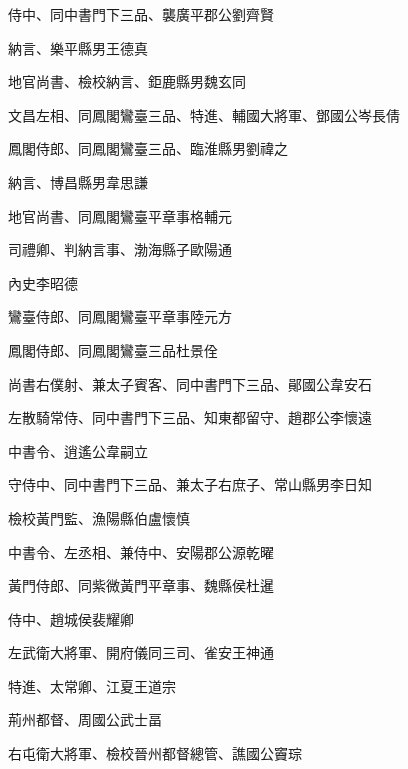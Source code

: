 \begin{pinyinscope}
 侍中、同中書門下三品、襲廣平郡公劉齊賢



 納言、樂平縣男王德真



 地官尚書、檢校納言、鉅鹿縣男魏玄同



 文昌左相、同鳳閣鸞臺三品、特進、輔國大將軍、鄧國公岑長倩



 鳳閣侍郎、同鳳閣鸞臺三品、臨淮縣男劉禕之



 納言、博昌縣男韋思謙



 地官尚書、同鳳閣鸞臺平章事格輔元



 司禮卿、判納言事、渤海縣子歐陽通



 內史李昭德



 鸞臺侍郎、同鳳閣鸞臺平章事陸元方



 鳳閣侍郎、同鳳閣鸞臺三品杜景佺



 尚書右僕射、兼太子賓客、同中書門下三品、鄖國公韋安石



 左散騎常侍、同中書門下三品、知東都留守、趙郡公李懷遠



 中書令、逍遙公韋嗣立



 守侍中、同中書門下三品、兼太子右庶子、常山縣男李日知



 檢校黃門監、漁陽縣伯盧懷慎



 中書令、左丞相、兼侍中、安陽郡公源乾曜



 黃門侍郎、同紫微黃門平章事、魏縣侯杜暹



 侍中、趙城侯裴耀卿



 左武衛大將軍、開府儀同三司、雀安王神通



 特進、太常卿、江夏王道宗



 荊州都督、周國公武士畐



 右屯衛大將軍、檢校晉州都督總管、譙國公竇琮




\end{pinyinscope}
